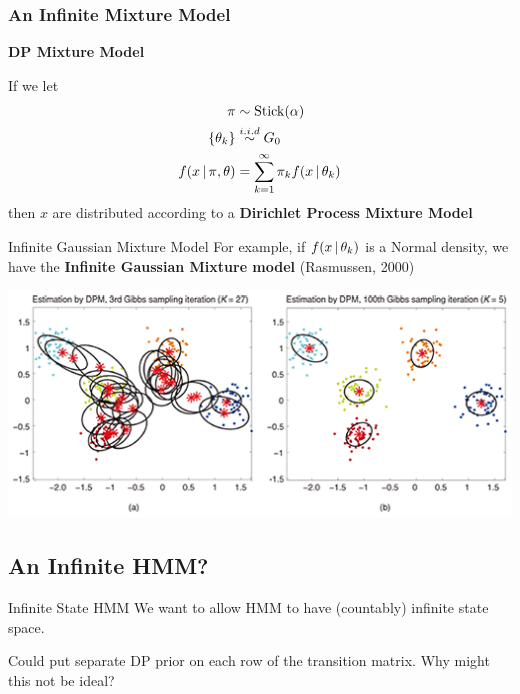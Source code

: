 \documentclass[11pt, mathserif, handout, table]{beamer}
\begin{document}
\begin{frame}
  \frametitle{An Infinite Mixture Model}
  \begin{exampleblock}{\small
      {\bf DP Mixture Model}
      \vspace{0.1in}

  If we let
  \begin{align}
    \label{eq:10}
    \pi &\sim \mathrm{Stick}(\alpha) \\
    \{\theta_k\} &\stackrel{i.i.d}{\sim} G_0 \\
    f(x \, \vert \, \pi, \theta) &= \sum_{k=1}^\infty \pi_k f(x \, \vert \,
    \theta_k)
  \end{align}
  then $x$ are distributed according to a {\bf Dirichlet Process
    Mixture Model}
}
\end{exampleblock}
\end{frame}

\begin{frame}{Infinite Gaussian Mixture Model}
For example, if $f(x \, \vert \, \theta_k)$ is a Normal density, we
  have the {\bf Infinite Gaussian Mixture model} (Rasmussen, 2000)
  \begin{center}
    \includegraphics[width=\textwidth]{img/dp_clusters.png}
  \end{center}
\end{frame}

\subsection{An Infinite HMM?}
\label{sec:infinite-hmm}

\begin{frame}{Infinite State HMM}
  We want to allow HMM to have (countably) infinite state space.

\vspace{0.2in}
  Could put separate DP prior on each row of the transition matrix.
  Why might this not be ideal?

\pause

\vspace{0.2in}

{\color{solarorange}{We would never visit the same state twice!}}
\end{frame}
\end{document}
